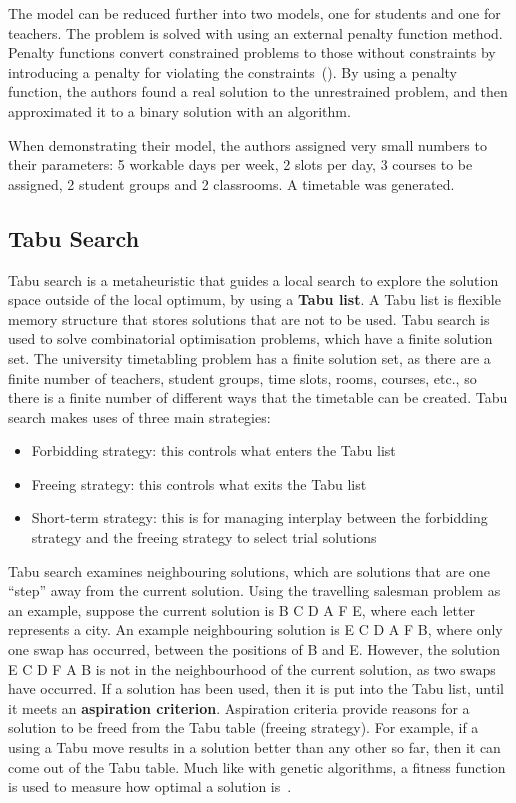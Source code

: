The model can be reduced further into two models, one for students and one for
teachers.
The problem is solved with using an external penalty function method. Penalty
functions convert constrained problems to those without constraints by
introducing a penalty for violating the constraints~(\cite{penalty_function}).
By using a penalty function, the authors found a real solution
to the unrestrained problem, and then approximated it to a binary solution with
an algorithm.

When demonstrating their model, the authors assigned very small numbers to their
parameters: 5 workable days per week, 2 slots per day, 3 courses to be assigned,
2 student groups and 2 classrooms. A timetable was generated.

\subsection{Tabu Search}

Tabu search is a metaheuristic that guides a local search to explore the
solution space outside of the local optimum, by using a \textbf{Tabu list}.
A Tabu list is flexible memory structure that stores solutions that are not to
be used.
Tabu search is used to solve combinatorial optimisation problems, which have a
finite solution set.
The university timetabling problem has a finite solution set, as there are a
finite number of teachers, student groups, time slots, rooms, courses, etc., so
there is a finite number of different ways that the timetable can be created.
Tabu search makes uses of three main strategies:
\begin{itemize}
	\item Forbidding strategy: this controls what enters the Tabu list
	\item Freeing strategy: this controls what exits the Tabu list
	\item Short-term strategy: this is for managing interplay between the
		forbidding strategy and the freeing strategy to select trial solutions
\end{itemize}
Tabu search examines neighbouring solutions, which are solutions that are one
“step” away from the current solution.
Using the travelling salesman problem as an example, suppose the current
solution is B C D A F E, where each letter represents a city.
An example neighbouring solution is E C D A F B, where only one swap has
occurred, between the positions of B and E.
However, the solution E C D F A B is not in the neighbourhood of the current
solution, as two swaps have occurred.
If a solution has been used, then it is put into the Tabu list, until it meets
an \textbf{aspiration criterion}.
Aspiration criteria provide reasons for a solution to be freed from the Tabu
table (freeing strategy).
For example, if a using a Tabu move results in a solution better than any other
so far, then it can come out of the Tabu table. Much like with genetic
algorithms, a fitness function is used to measure how optimal a solution 
is~\cite{tabu_video}.

